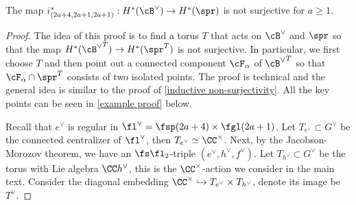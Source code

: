 \documentclass[12pt]{amsart}
\begin{document}
\begin{lemma} \label{3-row}
    The map $i_{(2a+4,2a+1,2a+1)}^*: H^*(\cB^\vee)\rightarrow H^*(\spr)$ is not surjective for $a\geqslant 1$.
\end{lemma}
\begin{proof}
    The idea of this proof is to find a torus $T$ that acts on $\cB^\vee$ and $\spr$ so that the map $H^*({\cB^\vee}^T)\rightarrow H^*(\spr^T)$ is not surjective. In particular, we first choose $T$ and then point out a connected component $\cF_\alpha$ of ${\cB^\vee}^T$ so that $\cF_\alpha\cap \spr^T$ consists of two isolated points. The proof is technical and the general idea is similar to the proof of \cref{inductive non-surjectivity}. All the key points can be seen in \cref{example proof} below.

    Recall that $e^\vee$ is regular in $\fl^\vee= \fsp({2a+4})\times \fgl({2a+1})$. Let $T_{e^\vee}\subset G^\vee$ be the connected centralizer of $\fl^\vee$, then $T_{e^\vee}\simeq \CC^\times$. Next, by the Jacobson-Morozov theorem, we have an $\fs\fl_2$-triple $(e^\vee,h^\vee,f^\vee)$. Let $T_{h^\vee}\subset G^\vee$ be the torus with Lie algebra $\CC h^\vee$, this is the $\CC^\times$-action we consider in the main text. Consider the diagonal embedding $\CC^\times\hookrightarrow T_{e^\vee}\times T_{h^\vee}$, denote its image be $T^\vee$.


\end{proof}
\end{document}
